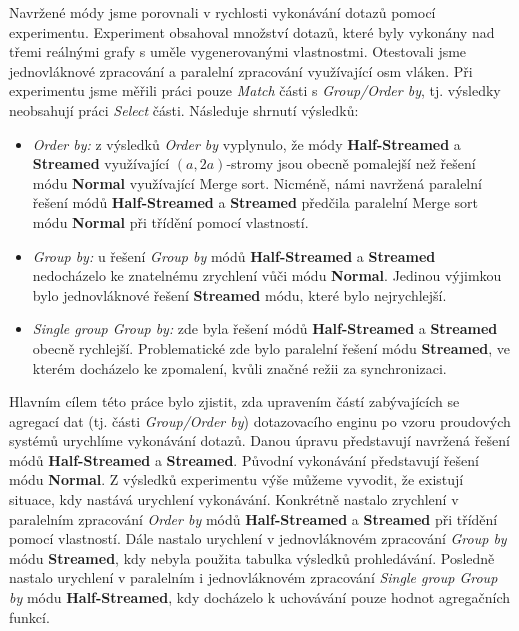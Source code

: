 Navržené módy jsme porovnali v rychlosti vykonávání dotazů pomocí experimentu.
Experiment obsahoval množství dotazů, které byly vykonány nad třemi reálnými grafy s uměle vygenerovanými vlastnostmi.
Otestovali jsme jednovláknové zpracování a paralelní zpracování využívající osm vláken.
Při experimentu jsme měřili práci pouze \textit{Match} části s \textit{Group/Order by}, tj. výsledky neobsahují práci \textit{Select} části.
Následuje shrnutí výsledků:
\begin{itemize}

\item \textit{Order by:} z výsledků \textit{Order by} vyplynulo, že módy \textbf{Half-Streamed} a \textbf{Streamed} využívající $(a, 2a)$-stromy jsou obecně pomalejší než řešení módu \textbf{Normal} využívající Merge sort.
Nicméně, námi navržená paralelní řešení módů \textbf{Half-Streamed} a \textbf{Streamed} předčila paralelní Merge sort módu \textbf{Normal} při třídění pomocí vlastností.

\item \textit{Group by:} u řešení \textit{Group by} módů \textbf{Half-Streamed} a \textbf{Streamed} nedocházelo ke znatelnému zrychlení vůči módu \textbf{Normal}.
Jedinou výjimkou bylo jednovláknové řešení \textbf{Streamed} módu, které bylo nejrychlejší.

\item \textit{Single group Group by:} zde byla řešení módů \textbf{Half-Streamed} a \textbf{Streamed} obecně rychlejší.
Problematické zde bylo paralelní řešení módu \textbf{Streamed}, ve kterém docházelo ke zpomalení, kvůli značné režii za synchronizaci.

\end{itemize}

Hlavním cílem této práce bylo zjistit, zda upravením částí zabývajících se agregací dat (tj. části  \textit{Group/Order by}) dotazovacího enginu po vzoru proudových systémů urychlíme vykonávání dotazů.
Danou úpravu představují navržená řešení módů \textbf{Half-Streamed} a \textbf{Streamed}.
Původní vykonávání představují řešení módu \textbf{Normal}.
Z výsledků experimentu výše můžeme vyvodit, že existují situace, kdy nastává urychlení vykonávání.
Konkrétně nastalo zrychlení v paralelním zpracování \textit{Order by} módů \textbf{Half-Streamed} a \textbf{Streamed} při třídění pomocí vlastností.
Dále nastalo urychlení v jednovláknovém zpracování \textit{Group by} módu \textbf{Streamed}, kdy nebyla použita tabulka výsledků prohledávání.
Posledně nastalo urychlení v paralelním i jednovláknovém zpracování \textit{Single group Group by} módu \textbf{Half-Streamed}, kdy docházelo k uchovávání pouze hodnot agregačních funkcí.

